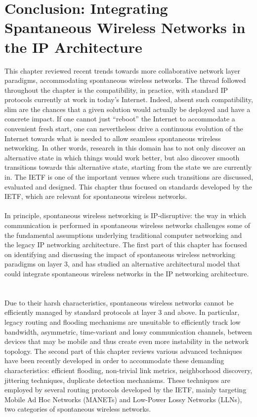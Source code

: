 \section{Conclusion: Integrating Spantaneous Wireless Networks in the IP Architecture\label{sec:conclusion}}

This chapter reviewed recent trends towards more collaborative network layer paradigms, accommodating spontaneous wireless networks. The thread followed throughout the chapter is the compatibility, in practice, with standard IP protocols currently at work in today's Internet. Indeed, absent such compatibility, slim are the chances that a given solution would actually be deployed and have a concrete impact. If one cannot just ``reboot'' the Internet to accommodate a convenient fresh start, one can nevertheless drive a continuous evolution of the Internet towards what is needed to allow seamless spontaneous wireless networking. In other words, research in this domain has to not only discover an alternative state in which things would work better, but also discover smooth transitions towards this alternative state, starting from the state we are currently in. The IETF is one of the important venues where such transitions are discussed, evaluated and designed. This chapter thus focused on standards developed by the IETF, which are relevant for spontaneous wireless networks. \ \\ \ \\
%
In principle, spontaneous wireless networking is IP-disruptive: the way in which communication is performed in spontaneous wireless networks challenges some of the fundamental assumptions underlying traditional computer networking and the legacy IP networking architecture. The first part of this chapter has focused on identifying and discussing the impact of spontaneous wireless networking paradigms on layer 3, and has studied an alternative architectural model that could integrate spontaneous wireless networks in the IP networking architecture. \ \\ \ \\
%
Due to their harsh characteristics, spontaneous wireless networks cannot be efficiently managed by standard protocols at layer 3 and above. In particular, legacy routing and flooding mechanisms are unsuitable to efficiently track low bandwidth, asymmetric, time-variant and lossy communication channels, between devices that may be mobile and thus create even more instability in the network topology. The second part of this chapter reviews various advanced techniques have been recently developed in order to accommodate these demanding characteristics: efficient flooding, non-trivial link metrics, neighborhood discovery, jittering techniques, duplicate detection mechanisms. These techniques are employed by several routing protocols developed by the IETF, mainly targeting Mobile Ad Hoc Networks (MANETs) and Low-Power Lossy Networks (LLNs), two categories of spontaneous wireless networks.\ \\ \ \\
